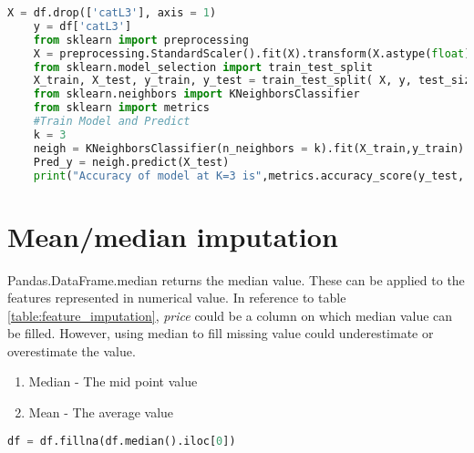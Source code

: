 \begin{lstlisting}[language=Python]
    X = df.drop(['catL3'], axis = 1)
    y = df['catL3']
    from sklearn import preprocessing
    X = preprocessing.StandardScaler().fit(X).transform(X.astype(float))
    from sklearn.model_selection import train_test_split
    X_train, X_test, y_train, y_test = train_test_split( X, y, test_size=0.2, random_state=4)
    from sklearn.neighbors import KNeighborsClassifier
    from sklearn import metrics
    #Train Model and Predict
    k = 3  
    neigh = KNeighborsClassifier(n_neighbors = k).fit(X_train,y_train)
    Pred_y = neigh.predict(X_test)
    print("Accuracy of model at K=3 is",metrics.accuracy_score(y_test, Pred_y))
\end{lstlisting}



\section{Mean/median imputation}

Pandas.DataFrame.median \parencite{mckinney-proc-scipy-2010} returns the median value. These can be applied to the features represented in numerical value. In reference to table \ref{table:feature_imputation}, \textit{price} could be a column on which median value can be filled. However, using median to fill missing value could underestimate or overestimate the value.

\begin{enumerate}
    \item Median - The mid point value
    \item Mean - The average value
\end{enumerate}

\begin{lstlisting}[language=Python]
    df = df.fillna(df.median().iloc[0])
\end{lstlisting}